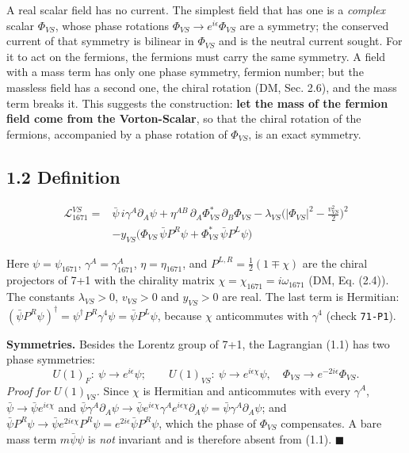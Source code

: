 \documentclass[
  10pt,
]{article}
\begin{document}
A real scalar field has no current. The simplest field that has one is a
\emph{complex} scalar \(\Phi_{VS}\), whose phase rotations
\(\Phi_{VS}\to e^{i\epsilon}\Phi_{VS}\) are a symmetry; the conserved
current of that symmetry is bilinear in \(\Phi_{VS}\) and is the neutral
current sought. For it to act on the fermions, the fermions must carry
the same symmetry. A field with a mass term has only one phase symmetry,
fermion number; but the massless field has a second one, the chiral
rotation (DM, Sec. 2.6), and the mass term breaks it. This suggests the
construction: \textbf{let the mass of the fermion field come from the
Vorton-Scalar}, so that the chiral rotation of the fermions, accompanied
by a phase rotation of \(\Phi_{VS}\), is an exact symmetry.

\hypertarget{definition}{%
\subsection{1.2 Definition}\label{definition}}

\[\boxed{\;\begin{aligned}\mathcal L_{1671}^{VS}={}&\bar\psi\,i\gamma^A\partial_A\psi
+\eta^{AB}\,\partial_A\Phi_{VS}^{*}\,\partial_B\Phi_{VS}
-\lambda_{VS}\Big(|\Phi_{VS}|^2-\frac{v_{VS}^2}{2}\Big)^{2}\\
&-y_{VS}\big(\Phi_{VS}\,\bar\psi P^{R}\psi+\Phi_{VS}^{*}\,\bar\psi P^{L}\psi\big)\end{aligned}\;}\tag{1.1}\]

Here \(\psi=\psi_{1671}\), \(\gamma^A=\gamma_{1671}^A\),
\(\eta=\eta_{1671}\), and \(P^{L,R}=\tfrac12(1\mp\chi)\) are the chiral
projectors of 7+1 with the chirality matrix
\(\chi=\chi_{1671}=i\omega_{1671}\) (DM, Eq. (2.4)). The constants
\(\lambda_{VS}>0\), \(v_{VS}>0\) and \(y_{VS}>0\) are real. The last
term is Hermitian:
\((\bar\psi P^{R}\psi)^\dagger=\psi^\dagger P^{R}\gamma^4\psi=\bar\psi P^{L}\psi\),
because \(\chi\) anticommutes with \(\gamma^4\) (check \texttt{71-P1}).

\textbf{Symmetries.} Besides the Lorentz group of 7+1, the Lagrangian
(1.1) has two phase symmetries:
\[U(1)_F:\ \psi\to e^{i\epsilon}\psi;\qquad
U(1)_{VS}:\ \psi\to e^{i\epsilon\chi}\psi,\quad\Phi_{VS}\to e^{-2i\epsilon}\Phi_{VS}.\tag{1.2}\]
\emph{Proof for \(U(1)_{VS}\).} Since \(\chi\) is Hermitian and
anticommutes with every \(\gamma^A\),
\(\bar\psi\to\bar\psi e^{i\epsilon\chi}\) and
\(\bar\psi\gamma^A\partial_A\psi\to\bar\psi e^{i\epsilon\chi}\gamma^Ae^{i\epsilon\chi}\partial_A\psi=\bar\psi\gamma^A\partial_A\psi\);
and
\(\bar\psi P^{R}\psi\to\bar\psi e^{2i\epsilon\chi}P^{R}\psi=e^{2i\epsilon}\bar\psi P^{R}\psi\),
which the phase of \(\Phi_{VS}\) compensates. A bare mass term
\(m\bar\psi\psi\) is \emph{not} invariant and is therefore absent from
(1.1). \(\blacksquare\)
\end{document}
